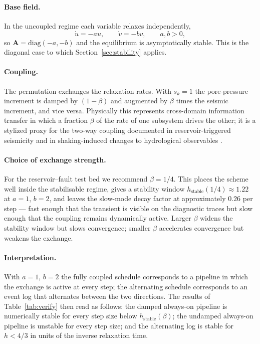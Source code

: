 \documentclass[12pt, a4paper]{article}
\theoremstyle{plain}
\theoremstyle{definition}
\theoremstyle{remark}
\newcommand{\bA}{\mathbf{A}}
\begin{document}
\paragraph{Base field.} In the uncoupled regime each variable relaxes
independently,
\begin{equation}
\dot{u} = -a u, \qquad \dot{v} = -b v, \qquad a,b>0,
\label{eq:base}
\end{equation}
so $\bA = \mathrm{diag}(-a,-b)$ and the equilibrium is asymptotically stable.
This is the diagonal case to which Section~\ref{sec:stability} applies.

\paragraph{Coupling.} The permutation exchanges the relaxation rates. With
$s_k=1$ the pore-pressure increment is damped by $(1-\beta)$ and augmented by
$\beta$ times the seismic increment, and vice versa. Physically this
represents cross-domain information transfer in which a fraction $\beta$ of
the rate of one subsystem drives the other; it is a stylized proxy for the
two-way coupling documented in reservoir-triggered seismicity
\cite{simpson1976,gupta1992} and in shaking-induced changes to hydrological
observables \cite{scholz1998}.

\paragraph{Choice of exchange strength.} For the reservoir--fault test bed we
recommend $\beta = 1/4$. This places the scheme well inside the stabilisable
regime, gives a stability window $h_{\mathrm{stable}}(1/4) \approx 1.22$ at
$a=1$, $b=2$, and leaves the slow-mode decay factor at approximately
$0.26$ per step — fast enough that the transient is visible on the diagnostic
traces but slow enough that the coupling remains dynamically active. Larger
$\beta$ widens the stability window but slows convergence; smaller $\beta$
accelerates convergence but weakens the exchange.

\paragraph{Interpretation.} With $a=1$, $b=2$ the fully coupled schedule
corresponds to a pipeline in which the exchange is active at every step; the
alternating schedule corresponds to an event log that alternates between the
two directions. The results of Table~\ref{tab:verify} then read as follows:
the damped always-on pipeline is numerically stable for every step size below
$h_{\mathrm{stable}}(\beta)$; the undamped always-on pipeline is unstable for
every step size; and the alternating log is stable for $h < 4/3$ in units of
the inverse relaxation time.
\end{document}
